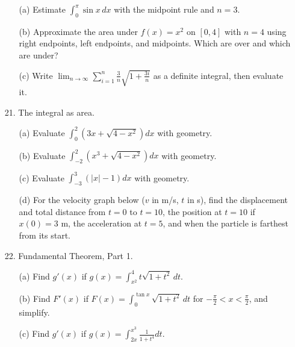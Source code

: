 \documentclass[12pt]{article}
\newcommand\abs[1]{\left| #1 \right|} %
\newcommand\parens[1]{\left( #1 \right)}
\begin{document}
\begin{enumerate}
\begin{enumerate}
\item[(a)] Estimate $\int_0^\pi \sin x\, dx$ with the midpoint rule and $n=3$.
\item[(b)] Approximate the area under $f(x) = x^2$ on $[0,4]$ with $n=4$ using right endpoints, left endpoints, and midpoints. Which are over and which are under?
\item[(c)] Write $\lim_{n \to \infty} \sum_{i=1}^n \frac{3}{n}\sqrt{1 + \frac{3i}{n}}$ as a definite integral, then evaluate it.
\end{enumerate}
\item[21.] The integral as area.
\begin{enumerate}
\item[(a)] Evaluate $\int_0^2 \parens{3x + \sqrt{4-x^2}} dx$ with geometry.
\item[(b)] Evaluate $\int_{-2}^2 \parens{x^3 + \sqrt{4-x^2}} dx$ with geometry.
\item[(c)] Evaluate $\int_{-3}^3 \parens{\abs{x} - 1} dx$ with geometry.
\item[(d)] For the velocity graph below ($v$ in m/s, $t$ in s), find the displacement and total distance from $t=0$ to $t=10$, the position at $t=10$ if $x(0)=3$ m, the acceleration at $t=5$, and when the particle is farthest from its start.
\begin{center}
\end{center}
\end{enumerate}
\item[22.] Fundamental Theorem, Part 1.
\begin{enumerate}
\item[(a)] Find $g'(x)$ if $g(x) = \int_{x^2}^4 t\sqrt{1+t^2}\, dt$.
\item[(b)] Find $F'(x)$ if $F(x) = \int_0^{\tan x} \sqrt{1+t^2}\, dt$ for $-\frac{\pi}{2} < x < \frac{\pi}{2}$, and simplify.
\item[(c)] Find $g'(x)$ if $g(x) = \int_{2x}^{x^3} \frac{1}{1+t^4} dt$.

\end{enumerate}
\end{enumerate}
\end{document}
